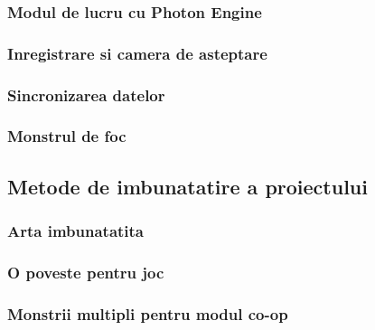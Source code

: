 \documentclass[12pt, a4paper]{article}
\begin{document}
	
	
	
	
	\subsubsection{Modul de lucru cu Photon Engine}
	
	
	
	
	
	\subsubsection{Inregistrare si camera de asteptare}
	
	
	
	
	
	\subsubsection{Sincronizarea datelor}
	
	
	
	
	
	\subsubsection{Monstrul de foc}
	
	
	
	
	
	\subsection{Metode de imbunatatire a proiectului}
	
	
	
	
	
	\subsubsection{Arta imbunatatita}
	
	
	
	
	
	\subsubsection{O poveste pentru joc}
	
	
	
	
	
	\subsubsection{Monstrii multipli pentru modul co-op}
	
\end{document}
